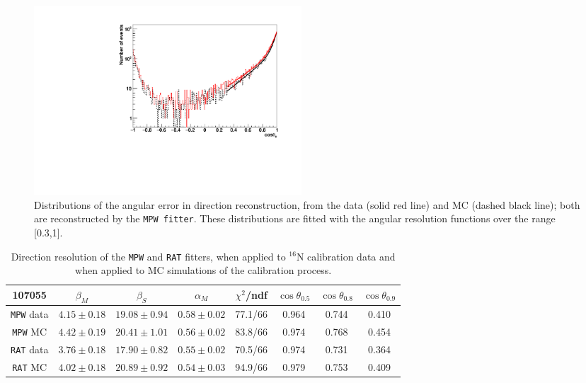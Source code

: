 \begin{figure}
	\centering
	\includegraphics[width=10cm]{16NangularResol.pdf}
	\caption[Distributions of the angular error in direction reconstruction, from the data and from MC.]{Distributions of the angular error in direction reconstruction, from the data (solid red line) and MC (dashed black line); both are reconstructed by the \texttt{MPW fitter}. These distributions are fitted with the angular resolution functions over the range [0.3,1].\label{angularResolMPW}}
\end{figure}

\begin{table}[ht]
	\caption[Direction resolution of the \texttt{MPW} and \texttt{RAT} fitters.]{Direction resolution of the \texttt{MPW} and \texttt{RAT} fitters, when applied to $^{16}$N calibration data and when applied to MC simulations of the calibration process.\label{tab:angularResolValuesUpdated}}
	\vspace{2.5mm}
	\begin{tabular}{cccccccc}%
		\toprule
	107055& $\beta_M$ &  $\beta_S$ & $\alpha_M$ & $\chi^2$/ndf & $\cos\theta_{0.5}$ & $\cos\theta_{0.8}$& $\cos\theta_{0.9}$\\
	\midrule
	\texttt{MPW} data & $4.15\pm0.18$ & $19.08\pm0.94$ & $0.58\pm0.02$ & 77.1/66 & 0.964 & 0.744 & 0.410 \\
	\texttt{MPW} MC & $4.42\pm0.19$ & $20.41\pm1.01$ & $0.56\pm0.02$ & 83.8/66 & 0.974 & 0.768 & 0.454	 \\	
\hline
	\texttt{RAT} data & $3.76\pm0.18$ & $17.90\pm0.82$ & $0.55\pm0.02$ & 70.5/66 & 0.974 & 0.731 & 0.364 \\
	\texttt{RAT} MC & $4.02\pm0.18$ & $20.89\pm0.92$ & $0.54\pm0.03$ & 94.9/66 & 0.979 & 0.753 & 0.409	\\
		\bottomrule
	\end{tabular}
\end{table}

